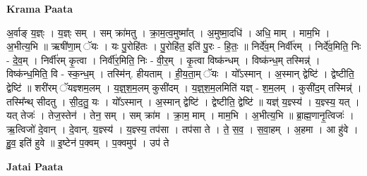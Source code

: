 \documentclass[17pt]{extarticle}
\begin{document}
\textbf{Krama Paata} \newline

अ॒र्वाङ् य॒ज्ञ्ः । य॒ज्ञ्ः सम् । सम् क्रा॑मतु । क्रा॒म॒त्व॒मुष्मा᳚त् । अ॒मुष्मा॒दधि॑ । अधि॒ माम् । माम॒भि । अ॒भीत्य॒भि ॥ ऋषी॑णा॒म् ॅयः । यः पु॒रोहि॑तः । पु॒रोहि॑त॒ इति॑ पु॒रः - हि॒तः॒ ॥ निर्दे॑व॒म् निर्वी॑रम् । निर्दे॑व॒मिति॒ निः - दे॒व॒म् । निर्वी॑रम् कृ॒त्वा । निर्वी॑र॒मिति॒ निः - वी॒र॒म् । कृ॒त्वा विष्क॑न्धम् । विष्क॑न्ध॒म् तस्मिन्न्॑ । विष्क॑न्ध॒मिति॒ वि - स्क॒न्ध॒म् । तस्मि॑न्. हीयताम् । ही॒य॒ता॒म् ॅयः । यो᳚ऽस्मान् । अ॒स्मान् द्वेष्टि॑ । द्वेष्टीति॒ द्वेष्टि॑ ॥ शरी॑रम् ॅयज्ञ्शम॒लम् । य॒ज्ञ्॒श॒म॒लम् कुसी॑दम् । य॒ज्ञ्॒श॒म॒लमिति॑ यज्ञ् - श॒म॒लम् । कुसी॑द॒म् तस्मिन्न्॑ । तस्मि᳚न्थ् सीदतु । सी॒द॒तु॒ यः । यो᳚ऽस्मान् । अ॒स्मान् द्वेष्टि॑ । द्वेष्टीति॒ द्वेष्टि॑ ॥ यज्ञ्॑ य॒ज्ञ्स्य॑ । य॒ज्ञ्स्य॒ यत् । यत् तेजः॑ । तेज॒स्तेन॑ । तेन॒ सम् । सम् क्रा॑म । क्रा॒म॒ माम् । माम॒भि । अ॒भीत्य॒भि ॥ ब्रा॒ह्म॒णानृ॒त्विजः॑ । ऋ॒त्विजो॑ दे॒वान् । दे॒वान्. य॒ज्ञ्स्य॑ । य॒ज्ञ्स्य॒ तप॑सा । तप॑सा ते । ते॒ स॒व॒ । स॒वा॒हम् । अ॒हमा । आ हु॑वे । हु॒व॒ इति॑ हुवे ॥ इ॒ष्टेन॑ प॒क्वम् । प॒क्वमुप॑ । उप॑ ते \newline

\textbf{Jatai Paata} \newline
\end{document}
